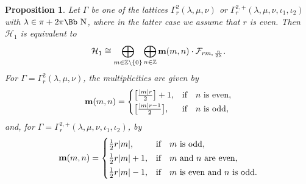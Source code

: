 \documentclass[10pt,a4paper]{amsart}
\newcommand\NN{{\mbox{\Bb N}}}
\newcommand\Z{{\mathbb Z}}
\newcommand\bm{\textbf{{\rm \textbf{m}}}}
\newcommand\cH{{\mathcal H}}
\newcommand\cF{{\mathcal F}}
\numberwithin{equation}{section}
\newtheorem{Proposition}[Theorem]{Proposition}
 { \theoremstyle{definition}
\newtheorem{Definition}[Theorem]{Definition}
\newtheorem{Note}[Theorem]{Note}
\newtheorem{Example}[Theorem]{Example}
\newtheorem{Remark}[Theorem]{Remark} }
\begin{document}
\begin{Proposition} \label{P1}
Let $\Gamma$ be one of the lattices $\Gamma_r^2(\lambda,\mu,\nu)$ or $\Gamma_r^{2,+}(\lambda,\mu,\nu,\iota_1,\iota_2)$ with $\lambda\in\pi+2\pi\NN$, where in the latter case we assume that $r$ is even.
Then $\cH_1$ is equivalent to
\begin{gather*}
\cH_1\cong\bigoplus_{m\in \Z\backslash\{0\}} \bigoplus_{n\in\Z} \bm(m,n)\cdot \cF_{rm,\,\frac n{2\lambda}}.
\end{gather*}
For $\Gamma=\Gamma_r^2(\lambda,\mu,\nu)$, the multiplicities are given by
\begin{gather*}
\bm(m,n) =\begin{cases}
\big[\frac{|m|r}2\big]+1,& \text{if\quad $n$ is even},
\\[.5ex]
\big[\frac{|m|r-1}2\big],& \text{if\quad $n$ is odd},
\end{cases}
\end{gather*}
and, for $\Gamma=\Gamma_r^{2,+}(\lambda,\mu,\nu,\iota_1,\iota_2)$, by
\begin{gather*}
\bm(m,n) =
\begin{cases}
 \frac12 r|m|, &\text{if\quad $m$ is odd},
 \\[0.5ex]
 \frac12 r|m| +1,&\text{if\quad $m$ and $n$ are even},
 \\[0.5ex]
 \frac12 r|m| -1, &\text{if\quad $m$ is even and $n$ is odd}.
 \end{cases}
 \end{gather*}
\end{Proposition}
\end{document}
